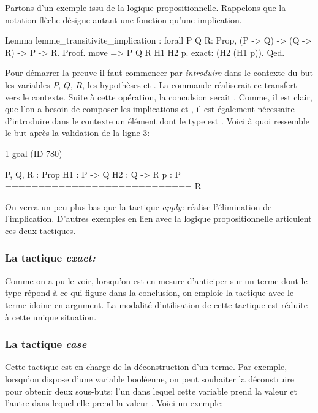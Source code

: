 \documentclass[a4paper,10pt]{article}
\begin{document}
Partons d'un exemple issu de la logique propositionnelle.  Rappelons que la notation flèche désigne autant
une fonction qu'une implication.

\begin{coq}[]
Lemma lemme_transitivite_implication : forall P Q R: Prop, (P -> Q) -> (Q -> R) -> P -> R.
Proof.
  move => P Q R H1 H2 p.
  exact: (H2 (H1 p)).
Qed.
\end{coq}

Pour démarrer la preuve il faut commencer par \emph{introduire} dans le contexte du but les variables \(P\), \(Q\),
\(R\), les hypothèses  et .  La commande  réaliserait ce transfert
vers le contexte.  Suite à cette opération, la conculsion serait .  Comme, il est clair, que l'on
a besoin de composer les implications  et , il est également nécessaire d'introduire dans le
contexte un élément dont le type est .  Voici à quoi ressemble le but après la validation de la ligne
3:

\begin{coqout}{}{}

1 goal (ID 780)

  P, Q, R : Prop
  H1 : P -> Q
  H2 : Q -> R
  p : P
  ============================
  R
\end{coqout}

On verra un peu plus bas que la tactique \emph{apply:} réalise l'élimination de l'implication.  D'autres exemples
en lien avec la logique propositionnelle articulent ces deux tactiques.

\subsubsection{La tactique \emph{exact:}}
\label{sec:org4148ae2}
Comme on a pu le voir, lorsqu'on est en mesure d'anticiper sur un terme dont le type répond à ce qui figure
dans la conclusion, on emploie la tactique  avec le terme idoine en argument.  La modalité
d'utilisation de cette tactique est réduite à cette unique situation.

\subsubsection{La tactique \emph{case}}
\label{sec:org43ed394}
Cette tactique est en charge de la déconstruction d'un terme.  Par exemple, lorsqu'on dispose d'une variable
booléenne, on peut souhaiter la déconstruire pour obtenir deux sous-buts: l'un dans lequel cette variable
prend la valeur  et l'autre dans lequel elle prend la valeur .  Voici un exemple:
\end{document}
